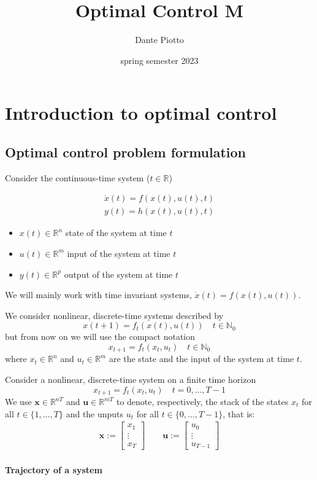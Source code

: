 \documentclass{book}
\title{Optimal Control M}
\author{Dante Piotto}
\date{spring semester 2023}
\newcommand{\R}{\mathbb{R}}
\newcommand{\N}{\mathbb{N}}
\theoremstyle{definition}
\theoremstyle{remark}
\theoremstyle{remark}
\begin{document}
\tableofcontents
\chapter{Introduction to optimal control}

\section{Optimal control problem formulation}
Consider the continuous-time system ($t\in\R$)

\begin{gather}
    \dot{x}(t) = f(x(t),u(t),t) \\
    y(t) = h(x(t),u(t),t)
\end{gather}
\begin{itemize}
    \item $x(t)\in\R^n$ state of the system at time $t$ 
    \item $u(t)\in\R^m$ input of the system at time $t$ 
    \item $y(t)\in\R^p$ output of the system at time $t$
\end{itemize}
We will mainly work with time invariant systems, $\dot{x}(t)=f(x(t),u(t))$. 

We consider nonlinear, discrete-time systems described by 
\[
    x(t+1)=f_t(x(t),u(t)) \quad t\in\N_0
\]
but from now on we will use the compact notation
\[
    x_{t+1}=f_t(x_t,u_t) \quad t\in\N_0
\]
where $x_t\in\R^n$ and $u_t\in\R^m$ are the state and the input of the system at time $t$.

Consider a nonlinear, discrete-time system on a finite time horizon 
\[
    x_{t+1} = f_t(x_t,u_t) \quad t=0,\dots,T-1
\]
We use $\mathbf{x}\in\R^{nT}$ and $\mathbf{u}\in\R^{mT}$ to denote, respectively, the stack of the states $x_t$ for all $t\in\{1,\dots,T\}$ and the unputs $u_t$ for all $t\in\{0,\dots,T-1\}$, that is:
\begin{gather*}
    \mathbf{x} := \begin{bmatrix}
        x_1 \\ \vdots \\ x_T
    \end{bmatrix} \qquad
    \mathbf{u} := \begin{bmatrix}
        u_0 \\ \vdots \\ u_{T-1}
    \end{bmatrix}
\end{gather*}

\subsubsection{Trajectory of a system}
\end{document}

